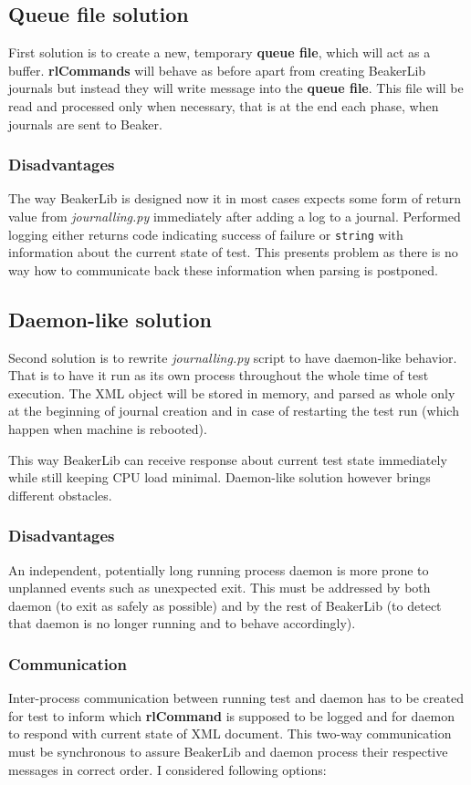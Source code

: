 \subsection{Queue file solution}
First solution is to create a new, temporary \textbf{queue file}, which will act as a buffer. \textbf{rlCommands} will behave as before apart from creating BeakerLib journals but instead they will write message into the \textbf{queue file}. This file will be read and processed only when necessary, that is at the end each phase, when journals are sent to Beaker.

\subsubsection{Disadvantages}
The way BeakerLib is designed now it in most cases expects some form of return value from \textit{journalling.py} immediately after adding a log to a journal. Performed logging either returns code indicating success of failure or \texttt{string} with information about the current state of test. This presents problem as there is no way how to communicate back these information when parsing is postponed. 

\subsection{Daemon-like solution}
Second solution is to rewrite \textit{journalling.py} script to have daemon-like behavior. That is to have it run as its own process throughout the whole time of test execution. The XML object will be stored in memory, and parsed as whole only at the beginning of journal creation and in case of restarting the test run (which happen when machine is rebooted).  

This way BeakerLib can receive response about current test state immediately while still keeping CPU load minimal. Daemon-like solution however brings different obstacles.

\subsubsection{Disadvantages}
An independent, potentially long running process daemon is more prone to unplanned events such as unexpected exit. This must be addressed by both daemon (to exit as safely as possible)  and by the rest of BeakerLib (to detect that daemon is no longer running and to behave accordingly). 

\subsubsection{Communication}
Inter-process communication between running test and daemon has to be created for test to inform which \textbf{rlCommand} is supposed to be logged and for daemon to respond with current state of XML document. This two-way communication must be synchronous to assure BeakerLib and daemon process their respective messages in correct order. I considered following options:

